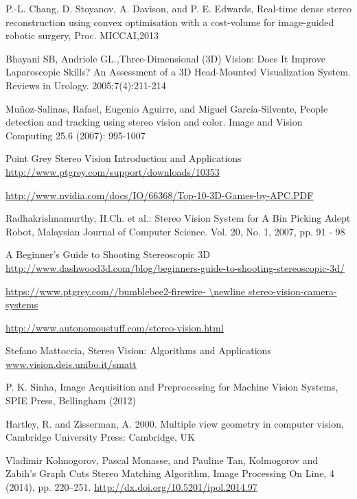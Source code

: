 
\begin{thebibliography}{99}

 P.-L. Chang, D. Stoyanov, A. Davison, and P. E. Edwards, Real-time
dense stereo reconstruction using convex optimisation with a cost-volume for image-guided robotic surgery, Proc. MICCAI,2013

Bhayani SB, Andriole GL.,Three-Dimensional (3D) Vision: Does It Improve Laparoscopic Skills? An Assessment of a 3D Head-Mounted Visualization System. Reviews in Urology. 2005;7(4):211-214


Muñoz-Salinas, Rafael, Eugenio Aguirre, and Miguel García-Silvente, People detection and tracking using stereo vision and color. Image and Vision Computing 25.6 (2007): 995-1007

 Point Grey Stereo Vision Introduction and Applications \url{http://www.ptgrey.com/support/downloads/10353}


 \url{http://www.nvidia.com/docs/IO/66368/Top-10-3D-Games-by-APC.PDF}


 Radhakrishnamurthy, H.Ch. et al.: Stereo Vision System for A Bin Picking Adept Robot, Malaysian Journal of Computer Science. Vol. 20, No. 1, 2007, pp. 91 - 98 

 A Beginner's Guide to Shooting Stereoscopic 3D \\ \url{http://www.dashwood3d.com/blog/beginners-guide-to-shooting-stereoscopic-3d/}

 \url{https://www.ptgrey.com//bumblebee2-firewire- \newline stereo-vision-camera-systems}

\url{http://www.autonomoustuff.com/stereo-vision.html}

Stefano Mattoccia, Stereo Vision: Algorithms and Applications
\url{www.vision.deis.unibo.it/smatt}

P. K. Sinha, Image Acquisition and Preprocessing for Machine Vision Systems, SPIE Press, Bellingham (2012)

Hartley, R. and Zisserman, A. 2000. Multiple view geometry in computer vision, Cambridge University Press: Cambridge, UK


Vladimir Kolmogorov, Pascal Monasse, and Pauline Tan, Kolmogorov and Zabih’s Graph Cuts Stereo Matching Algorithm, Image Processing On Line, 4 (2014), pp. 220–251. \url{http://dx.doi.org/10.5201/ipol.2014.97}


\end{thebibliography}
